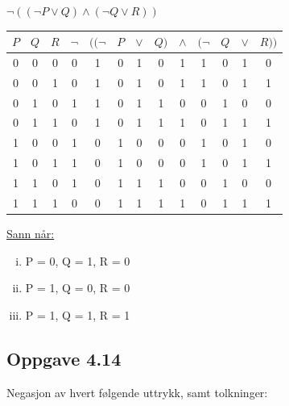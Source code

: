 \documentclass{article}
\begin{document}
\hspace{7.4em} 

\(\neg((\neg P \vee Q) \wedge (\neg Q \vee R))\)

\begin{tabular}{c c c | c c c c c c c c c c}
    $P$ & $Q$ & $R$ & $\neg$ & $((\neg$ & $P$ & $\vee$ & $Q)$ & $\wedge$ & $(\neg$ & $Q$ & $\vee$ & $R))$\\
    \hline
    0 & 0 & 0 & 0 & 1 & 0 & 1 & 0 & 1 & 1 & 0 & 1 & 0 \\
    0 & 0 & 1 & 0 & 1 & 0 & 1 & 0 & 1 & 1 & 0 & 1 & 1 \\
    \rowcolor{lightgray}
    0 & 1 & 0 & 1 & 1 & 0 & 1 & 1 & 0 & 0 & 1 & 0 & 0 \\
    0 & 1 & 1 & 0 & 1 & 0 & 1 & 1 & 1 & 0 & 1 & 1 & 1 \\
    \rowcolor{lightgray}
    1 & 0 & 0 & 1 & 0 & 1 & 0 & 0 & 0 & 1 & 0 & 1 & 0 \\
    \rowcolor{lightgray}
    1 & 0 & 1 & 1 & 0 & 1 & 0 & 0 & 0 & 1 & 0 & 1 & 1 \\
    \rowcolor{lightgray}
    1 & 1 & 0 & 1 & 0 & 1 & 1 & 1 & 0 & 0 & 1 & 0 & 0 \\
    1 & 1 & 1 & 0 & 0 & 1 & 1 & 1 & 1 & 0 & 1 & 1 & 1 \\
\end{tabular}

\underline{Sann når:}
\begin{enumerate}[(i)]
    \item P = 0, Q = 1, R = 0
    \item P = 1, Q = 0, R = 0
    \item P = 1, Q = 1, R = 1
\end{enumerate}

\newpage
\subsection*{Oppgave 4.14}

Negasjon av hvert følgende uttrykk, samt tolkninger:
\end{document}
